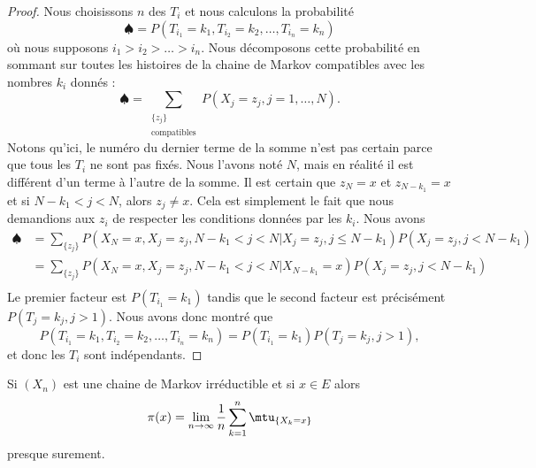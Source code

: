 \begin{proof}
	Nous choisissons \( n\) des \( T_i\) et nous calculons la probabilité
	\begin{equation}
		\spadesuit=P(T_{i_1}=k_1,T_{i_2}=k_2,\ldots,T_{i_n}=k_n)
	\end{equation}
	où nous supposons \( i_1>i_2>\ldots>i_n\). Nous décomposons cette probabilité en sommant sur toutes les histoires de la chaine de Markov compatibles avec les nombres \( k_i\) donnés :
	\begin{equation}
		\spadesuit=\sum_{\substack{\{ z_j \}\\\text{compatibles}}}P(X_j=z_j,j=1,\ldots,N).
	\end{equation}
	Notons qu'ici, le numéro du dernier terme de la somme n'est pas certain parce que tous les \( T_i\) ne sont pas fixés. Nous l'avons noté \( N\), mais en réalité il est différent d'un terme à l'autre de la somme. Il est certain que \( z_N=x\) et \( z_{N-k_1}=x\) et si \( N-k_1<j<N\), alors \( z_j\neq x\). Cela est simplement le fait que nous demandions aux \( z_i\) de respecter les conditions données par les \( k_i\). Nous avons
	\begin{subequations}
		\begin{align}
			\spadesuit & =\sum_{\{ z_j \}} P(X_N=x,X_j=z_j,N-k_1<j<N|X_j=z_j,j\leq N-k_1)P(X_j=z_j,j<N-k_1) \\
			           & =\sum_{\{ z_j \}} P(X_N=x,X_j=z_j,N-k_1<j<N|X_{N-k_1}=x)P(X_j=z_j,j<N-k_1)         \\
		\end{align}
	\end{subequations}
	Le premier facteur est \( P(T_{i_1}=k_1)\) tandis que le second facteur est précisément \( P(T_{j}=k_j,j>1)\). Nous avons donc montré que
	\begin{equation}
		P(T_{i_1}=k_1,T_{i_2}=k_2,\ldots,T_{i_n}=k_n)=P(T_{i_1}=k_1)P(T_{j}=k_j,j>1),
	\end{equation}
	et donc les \( T_i\) sont indépendants.
\end{proof}

\begin{proposition}     \label{PropjOjDux}
	Si \( (X_n)\) est une chaine de Markov irréductible et si \( x\in E\) alors
	\begin{equation}        \label{EqPiEndempropropkeu}
		\pi(x)=\lim_{n\to \infty} \frac{1}{ n }\sum_{k=1}^n\mtu_{\{ X_k=x \}}
	\end{equation}
	presque surement.
\end{proposition}

